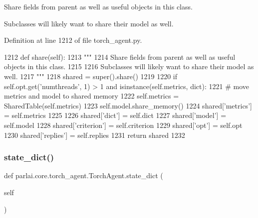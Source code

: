 \begin{DoxyVerb}Share fields from parent as well as useful objects in this class.

Subclasses will likely want to share their model as well.
\end{DoxyVerb}
 

Definition at line 1212 of file torch\+\_\+agent.\+py.


\begin{DoxyCode}
1212     \textcolor{keyword}{def }share(self):
1213         \textcolor{stringliteral}{"""}
1214 \textcolor{stringliteral}{        Share fields from parent as well as useful objects in this class.}
1215 \textcolor{stringliteral}{}
1216 \textcolor{stringliteral}{        Subclasses will likely want to share their model as well.}
1217 \textcolor{stringliteral}{        """}
1218         shared = super().share()
1219 
1220         \textcolor{keywordflow}{if} self.opt.get(\textcolor{stringliteral}{'numthreads'}, 1) > 1 \textcolor{keywordflow}{and} isinstance(self.metrics, dict):
1221             \textcolor{comment}{# move metrics and model to shared memory}
1222             self.metrics = SharedTable(self.metrics)
1223             self.model.share\_memory()
1224         shared[\textcolor{stringliteral}{'metrics'}] = self.metrics
1225 
1226         shared[\textcolor{stringliteral}{'dict'}] = self.dict
1227         shared[\textcolor{stringliteral}{'model'}] = self.model
1228         shared[\textcolor{stringliteral}{'criterion'}] = self.criterion
1229         shared[\textcolor{stringliteral}{'opt'}] = self.opt
1230         shared[\textcolor{stringliteral}{'replies'}] = self.replies
1231         \textcolor{keywordflow}{return} shared
1232 
\end{DoxyCode}
\mbox{\label{classparlai_1_1core_1_1torch__agent_1_1TorchAgent_a9f89e606931a4622a5c6a6f6b832235c}} 
\subsubsection{\texorpdfstring{state\+\_\+dict()}{state\_dict()}}
{\footnotesize\ttfamily def parlai.\+core.\+torch\+\_\+agent.\+Torch\+Agent.\+state\+\_\+dict (\begin{DoxyParamCaption}\item[{}]{self }\end{DoxyParamCaption})}

